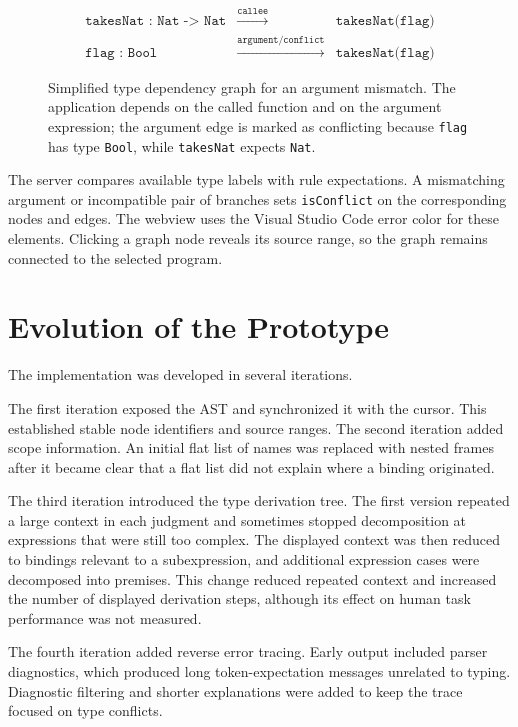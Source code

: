 \begin{figure}[htbp]
    \centering
    \[
    \begin{array}{ccc}
        \texttt{takesNat : Nat -> Nat} & \xrightarrow{\texttt{callee}} & \texttt{takesNat(flag)} \\[0.8em]
        \texttt{flag : Bool} & \xrightarrow{\texttt{argument/conflict}} & \texttt{takesNat(flag)}
    \end{array}
    \]
    \caption[Type dependency graph for an argument mismatch]{Simplified type dependency graph for an argument mismatch. The application depends on the called function and on the argument expression; the argument edge is marked as conflicting because \texttt{flag} has type \texttt{Bool}, while \texttt{takesNat} expects \texttt{Nat}.}
    \label{fig:dependency-graph}
\end{figure}

The server compares available type labels with rule expectations. A mismatching argument or incompatible pair of branches sets \texttt{isConflict} on the corresponding nodes and edges. The webview uses the Visual Studio Code error color for these elements. Clicking a graph node reveals its source range, so the graph remains connected to the selected program.

\section{Evolution of the Prototype}

The implementation was developed in several iterations.

The first iteration exposed the AST and synchronized it with the cursor. This established stable node identifiers and source ranges. The second iteration added scope information. An initial flat list of names was replaced with nested frames after it became clear that a flat list did not explain where a binding originated.

The third iteration introduced the type derivation tree. The first version repeated a large context in each judgment and sometimes stopped decomposition at expressions that were still too complex. The displayed context was then reduced to bindings relevant to a subexpression, and additional expression cases were decomposed into premises. This change reduced repeated context and increased the number of displayed derivation steps, although its effect on human task performance was not measured.

The fourth iteration added reverse error tracing. Early output included parser diagnostics, which produced long token-expectation messages unrelated to typing. Diagnostic filtering and shorter explanations were added to keep the trace focused on type conflicts.

